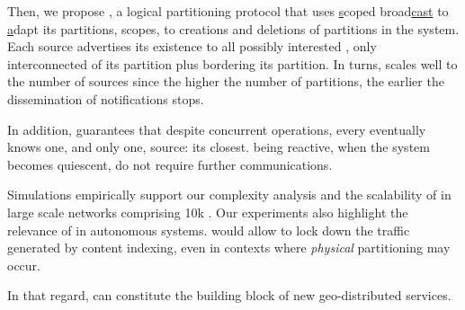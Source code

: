 \noindent Then, we propose \NAME, a logical partitioning protocol that
uses \underline{s}coped broad\underline{cast} to \underline{a}dapt its
partitions, \ie scopes, to creations and deletions of partitions in
the system. Each source advertises its existence to all possibly
interested \processes, \ie only interconnected \processes of its
partition plus \processes bordering its partition. In turns, \NAME
scales well to the number of sources since the higher the number of
partitions, the earlier the dissemination of notifications stops.
%
%

\noindent In addition, \NAME guarantees that despite concurrent
operations, every \process eventually knows one, and only one, source:
its closest. \NAME being reactive, when the system becomes quiescent,
\processes do not require further communications.

\noindent Simulations empirically support our complexity analysis and
the scalability of \NAME in large scale networks comprising 10k
\processes. Our experiments also highlight the relevance of \NAME in
autonomous systems. \NAME would allow to lock down the traffic
generated by content indexing, even in contexts where \emph{physical}
partitioning may occur.

\noindent In that regard, \NAME can constitute the building block of
new geo-distributed services.

